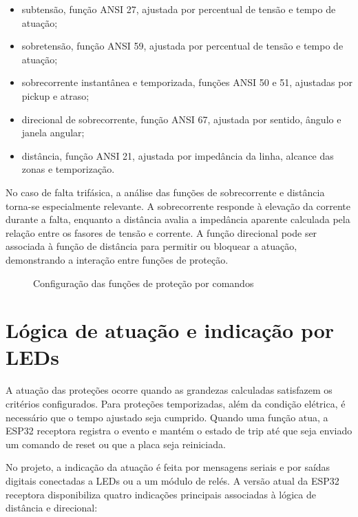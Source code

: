 \begin{itemize}
  \item subtensão, função ANSI 27, ajustada por percentual de tensão e tempo de atuação;
  \item sobretensão, função ANSI 59, ajustada por percentual de tensão e tempo de atuação;
  \item sobrecorrente instantânea e temporizada, funções ANSI 50 e 51, ajustadas por pickup e atraso;
  \item direcional de sobrecorrente, função ANSI 67, ajustada por sentido, ângulo e janela angular;
  \item distância, função ANSI 21, ajustada por impedância da linha, alcance das zonas e temporização.
\end{itemize}

No caso de falta trifásica, a análise das funções de sobrecorrente e distância torna-se especialmente relevante. A sobrecorrente responde à elevação da corrente durante a falta, enquanto a distância avalia a impedância aparente calculada pela relação entre os fasores de tensão e corrente. A função direcional pode ser associada à função de distância para permitir ou bloquear a atuação, demonstrando a interação entre funções de proteção.

\begin{figure}[H]
  \centering
  \caption{Configuração das funções de proteção por comandos}
  \label{fig:configuracao-protecoes}
\end{figure}

\section{Lógica de atuação e indicação por LEDs}

A atuação das proteções ocorre quando as grandezas calculadas satisfazem os critérios configurados. Para proteções temporizadas, além da condição elétrica, é necessário que o tempo ajustado seja cumprido. Quando uma função atua, a ESP32 receptora registra o evento e mantém o estado de trip até que seja enviado um comando de reset ou que a placa seja reiniciada.

No projeto, a indicação da atuação é feita por mensagens seriais e por saídas digitais conectadas a LEDs ou a um módulo de relés. A versão atual da ESP32 receptora disponibiliza quatro indicações principais associadas à lógica de distância e direcional:

